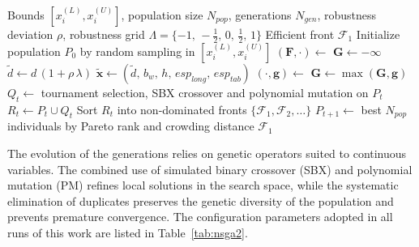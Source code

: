  \begin{algorithm}[!ht]
 \caption{Robust multi-objective optimization via NSGA-II}
 \label{alg:nsga2}
 \begin{algorithmic}[1]
 \Require Bounds $[x_i^{(L)}, x_i^{(U)}]$, population size $N_{pop}$, generations $N_{gen}$, robustness deviation $\rho$, robustness grid $\Lambda = \{-1,\,-\tfrac{1}{2},\,0,\,\tfrac{1}{2},\,1\}$
 \Ensure Efficient front $\mathcal{F}_1$
 \State Initialize population $P_0$ by random sampling in $[x_i^{(L)}, x_i^{(U)}]$
     \State $(\mathbf{F}, \cdot) \gets$  
     \State $\mathbf{G} \gets -\boldsymbol{\infty}$
      
       \State $\tilde{d} \gets d\,(1 + \rho\,\lambda)$
       \State $\tilde{\mathbf{x}} \gets (\tilde{d},\,b_w,\,h,\,esp_{long},\,esp_{tab})$
       \State $(\cdot, \mathbf{g}) \gets$ 
       \State $\mathbf{G} \gets \max(\mathbf{G}, \mathbf{g})$ 
     \EndFor
   \EndFor
   \State $Q_t \gets$ tournament selection, SBX crossover and polynomial mutation on $P_t$
   \State $R_t \gets P_t \cup Q_t$
   \State Sort $R_t$ into non-dominated fronts $\{\mathcal{F}_1, \mathcal{F}_2, \ldots\}$
   \State $P_{t+1} \gets$ best $N_{pop}$ individuals by Pareto rank and crowding distance
 \EndFor
 \State \Return $\mathcal{F}_1$
 \end{algorithmic}
 \end{algorithm}

The evolution of the generations relies on genetic operators suited to continuous variables.
The combined use of simulated binary crossover (SBX) and polynomial mutation (PM) refines local solutions in the search space, while the systematic elimination of duplicates preserves the genetic diversity of the population and prevents premature convergence.
The configuration parameters adopted in all runs of this work are listed in Table~\ref{tab:nsga2}.

